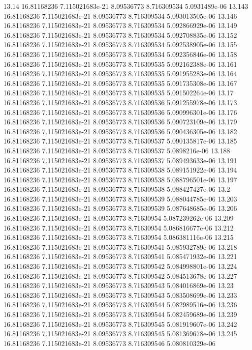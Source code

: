{13.14 16.81168236 7.115021683e-21 8.09536773 8.716309534 5.0931489e-06
13.143 16.81168236 7.115021683e-21 8.09536773 8.716309534 5.093013505e-06
13.146 16.81168236 7.115021683e-21 8.09536773 8.716309534 5.092866929e-06
13.149 16.81168236 7.115021683e-21 8.09536773 8.716309534 5.092708835e-06
13.152 16.81168236 7.115021683e-21 8.09536773 8.716309534 5.092538905e-06
13.155 16.81168236 7.115021683e-21 8.09536773 8.716309534 5.092356846e-06
13.158 16.81168236 7.115021683e-21 8.09536773 8.716309535 5.092162388e-06
13.161 16.81168236 7.115021683e-21 8.09536773 8.716309535 5.091955283e-06
13.164 16.81168236 7.115021683e-21 8.09536773 8.716309535 5.091735308e-06
13.167 16.81168236 7.115021683e-21 8.09536773 8.716309535 5.091502264e-06
13.17 16.81168236 7.115021683e-21 8.09536773 8.716309536 5.091255978e-06
13.173 16.81168236 7.115021683e-21 8.09536773 8.716309536 5.090996301e-06
13.176 16.81168236 7.115021683e-21 8.09536773 8.716309536 5.090723109e-06
13.179 16.81168236 7.115021683e-21 8.09536773 8.716309536 5.090436305e-06
13.182 16.81168236 7.115021683e-21 8.09536773 8.716309537 5.090135817e-06
13.185 16.81168236 7.115021683e-21 8.09536773 8.716309537 5.0898216e-06
13.188 16.81168236 7.115021683e-21 8.09536773 8.716309537 5.089493633e-06
13.191 16.81168236 7.115021683e-21 8.09536773 8.716309538 5.089151922e-06
13.194 16.81168236 7.115021683e-21 8.09536773 8.716309538 5.088796501e-06
13.197 16.81168236 7.115021683e-21 8.09536773 8.716309538 5.088427427e-06
13.2 16.81168236 7.115021683e-21 8.09536773 8.716309539 5.088044785e-06
13.203 16.81168236 7.115021683e-21 8.09536773 8.716309539 5.087648685e-06
13.206 16.81168236 7.115021683e-21 8.09536773 8.71630954 5.087239262e-06
13.209 16.81168236 7.115021683e-21 8.09536773 8.71630954 5.086816677e-06
13.212 16.81168236 7.115021683e-21 8.09536773 8.71630954 5.086381116e-06
13.215 16.81168236 7.115021683e-21 8.09536773 8.716309541 5.085932789e-06
13.218 16.81168236 7.115021683e-21 8.09536773 8.716309541 5.085471932e-06
13.221 16.81168236 7.115021683e-21 8.09536773 8.716309542 5.084998801e-06
13.224 16.81168236 7.115021683e-21 8.09536773 8.716309542 5.084513678e-06
13.227 16.81168236 7.115021683e-21 8.09536773 8.716309543 5.084016869e-06
13.23 16.81168236 7.115021683e-21 8.09536773 8.716309543 5.083508699e-06
13.233 16.81168236 7.115021683e-21 8.09536773 8.716309544 5.082989516e-06
13.236 16.81168236 7.115021683e-21 8.09536773 8.716309544 5.082459689e-06
13.239 16.81168236 7.115021683e-21 8.09536773 8.716309545 5.081919607e-06
13.242 16.81168236 7.115021683e-21 8.09536773 8.716309545 5.081369678e-06
13.245 16.81168236 7.115021683e-21 8.09536773 8.716309546 5.080810329e-06
}
